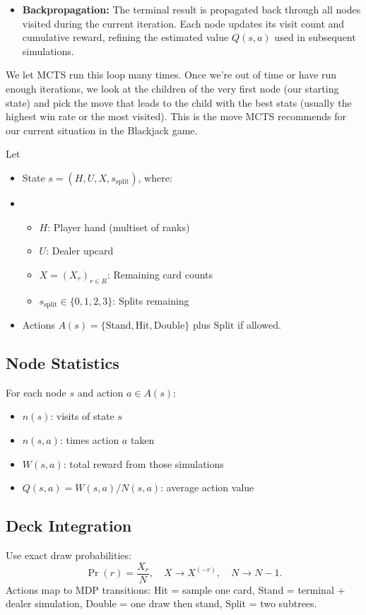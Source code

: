 \documentclass[12pt,a4paper]{cibb}
\begin{document}
\begin{itemize} 
    \item \textbf{Backpropagation:} The terminal result is propagated back through all nodes visited during the current iteration. Each node updates its visit count and cumulative reward, refining the estimated value $Q(s, a)$ used in subsequent simulations.
\end{itemize}

We let MCTS run this loop many times. Once we're out of time or have run enough iterations, we look at the children of the very first node (our starting state) and pick the move that leads to the child with the best stats (usually the highest win rate or the most visited). This is the move MCTS recommends for our current situation in the Blackjack game.

Let
\begin{itemize}
    \item State \(s=(H, U, X, s_{\mathrm{split}})\), where:
    \item \begin{itemize}[leftmargin=1.5cm]
\item \(H\): Player hand (multiset of ranks)
\item \(U\): Dealer up\-card
\item \(X=(X_r)_{r\in R}\): Remaining card counts
\item \(s_{\mathrm{split}}\in\{0,1,2,3\}\): Splits remaining
\end{itemize}
    \item Actions \(A(s)=\{\mathrm{Stand},\mathrm{Hit},\mathrm{Double}\}\) plus \(\mathrm{Split}\) if allowed.
\end{itemize}

\subsection{Node Statistics}
For each node \(s\) and action \(a\in A(s)\):
\begin{itemize}[leftmargin=1.5cm]
  \item \(n(s)\): visits of state \(s\)
  \item \(n(s,a)\): times action \(a\) taken
  \item \(W(s,a)\): total reward from those simulations
  \item \(Q(s,a)=W(s,a)/N(s,a)\): average action value
\end{itemize}

\subsection{{Deck Integration}}
Use exact draw probabilities:
\[\Pr(r)=\frac{X_r}{N},\quad X\to X^{(-r)},\quad N\to N-1.\]
Actions map to MDP transitions: Hit = sample one card, Stand = terminal + dealer simulation, Double = one draw then stand, Split = two subtrees.
\end{document}
